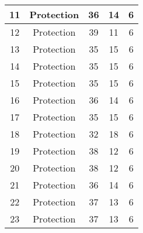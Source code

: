 \documentclass[results.tex]{subfiles}
\begin{document}
\begin{center}
\begin{tabular}{| c || c | c | c | c |}
            \hline
            11                      & Protection                   & 36                     & 14                      & 6                    \\
            \hline
            12                      & Protection                   & 39                     & 11                      & 6                    \\
            \hline
            13                      & Protection                   & 35                     & 15                      & 6                    \\
            \hline
            14                      & Protection                   & 35                     & 15                      & 6                    \\
            \hline
            15                      & Protection                   & 35                     & 15                      & 6                    \\
            \hline
            16                      & Protection                   & 36                     & 14                      & 6                    \\
            \hline
            17                      & Protection                   & 35                     & 15                      & 6                    \\
            \hline
            18                      & Protection                   & 32                     & 18                      & 6                    \\
            \hline
            19                      & Protection                   & 38                     & 12                      & 6                    \\
            \hline
            20                      & Protection                   & 38                     & 12                      & 6                    \\
            \hline
            21                      & Protection                   & 36                     & 14                      & 6                    \\
            \hline
            22                      & Protection                   & 37                     & 13                      & 6                    \\
            \hline
            23                      & Protection                   & 37                     & 13                      & 6                    \\

\end{tabular}
\end{center}
\end{document}
